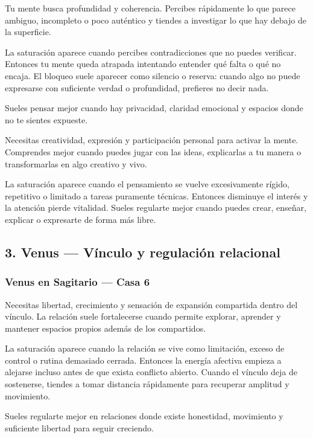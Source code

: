 \documentclass[11pt,a4paper]{article}
\begin{document}
\justifying
Tu mente busca profundidad y coherencia. Percibes rápidamente lo que parece ambiguo, incompleto o poco auténtico y tiendes a investigar lo que hay debajo de la superficie.

La saturación aparece cuando percibes contradicciones que no puedes verificar. Entonces tu mente queda atrapada intentando entender qué falta o qué no encaja. El bloqueo suele aparecer como silencio o reserva: cuando algo no puede expresarse con suficiente verdad o profundidad, prefieres no decir nada.

Sueles pensar mejor cuando hay privacidad, claridad emocional y espacios donde no te sientes expueste.

Necesitas creatividad, expresión y participación personal para activar la mente. Comprendes mejor cuando puedes jugar con las ideas, explicarlas a tu manera o transformarlas en algo creativo y vivo.

La saturación aparece cuando el pensamiento se vuelve excesivamente rígido, repetitivo o limitado a tareas puramente técnicas. Entonces disminuye el interés y la atención pierde vitalidad. Sueles regularte mejor cuando puedes crear, enseñar, explicar o expresarte de forma más libre.

\vspace{0.8cm}

\subsection{3. Venus — Vínculo y regulación relacional}

\subsubsection*{Venus en Sagitario — Casa 6}

\justifying
Necesitas libertad, crecimiento y sensación de expansión compartida dentro del vínculo. La relación suele fortalecerse cuando permite explorar, aprender y mantener espacios propios además de los compartidos.

La saturación aparece cuando la relación se vive como limitación, exceso de control o rutina demasiado cerrada. Entonces la energía afectiva empieza a alejarse incluso antes de que exista conflicto abierto. Cuando el vínculo deja de sostenerse, tiendes a tomar distancia rápidamente para recuperar amplitud y movimiento.

Sueles regularte mejor en relaciones donde existe honestidad, movimiento y suficiente libertad para seguir creciendo.
\end{document}
